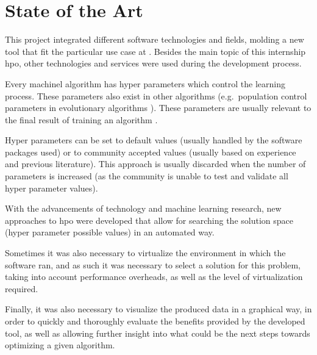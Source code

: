 
\section{State of the Art}

This project integrated different software technologies and fields, molding a new tool that fit the particular use case at \faro. Besides the main topic of this internship \acrshort{hpo}, other technologies and services were used during the development process.

Every \acrshort{machinel} algorithm has hyper parameters \parencite[ch.\ 1]{Feurer2019} which control the learning process. These parameters also exist in other algorithms (e.g.\ population control parameters in evolutionary algorithms \parencite{ptuningevo2011}). These parameters are usually relevant to the final result of training an algorithm \parencite{Bergstra2012}.

Hyper parameters can be set to default values (usually handled by the software packages used) or to community accepted values (usually based on experience and previous literature). This approach is usually discarded when the number of parameters is increased (as the community is unable to test and validate all hyper parameter values).

With the advancements of technology and machine learning research, new approaches to \acrshort{hpo} were developed that allow for searching the solution space (hyper parameter possible values) in an automated way.

Sometimes it was also necessary to virtualize the environment in which the software ran, and as such it was necessary to select a solution for this problem, taking into account performance overheads, as well as the level of virtualization required. 

Finally, it was also necessary to visualize the produced data in a graphical way, in order to quickly and thoroughly evaluate the benefits provided by the developed tool, as well as allowing further insight into what could be the next steps towards optimizing a given algorithm.



